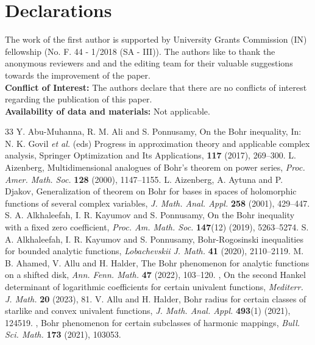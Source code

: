 \documentclass[11pt,reqno]{amsart}
\newtheorem{open problem}{Open problem}[section]
\numberwithin{equation}{section}
\begin{document}
\section{Declarations}
 The work of the first author is supported by University Grants Commission (IN) fellowship (No. F. 44 - 1/2018 (SA - III)). The authors like to
thank the anonymous reviewers and and the editing team for their valuable suggestions towards the improvement of the paper.\\[2mm]
{\bf Conflict of Interest:} The authors declare that there are no conflicts of interest regarding the publication of this paper.\\[1mm]
{\bf Availability of data and materials:} Not applicable.\\[1mm]
\begin{thebibliography}{33}
 {\sc Y. Abu-Muhanna, R. M. Ali and S. Ponnusamy}, On the Bohr inequality,  In: N. K. Govil {\it et al.} (eds) Progress in approximation theory and applicable complex analysis, Springer Optimization and Its Applications, {\bf117} (2017), 269--300. 
 {\sc L. Aizenberg}, Multidimensional analogues of Bohr's theorem on power series, {\it Proc. Amer. Math. Soc.} {\bf128} (2000), 1147--1155.
 {\sc L. Aizenberg, A. Aytuna and P. Djakov}, Generalization of theorem on Bohr for bases in spaces of holomorphic functions of several complex variables, {\it J. Math. Anal. Appl.} {\bf258} (2001), 429--447.
 {\sc S. A. Alkhaleefah, I. R. Kayumov and S. Ponnusamy}, On the Bohr inequality with a fixed zero coefficient, {\it Proc. Am. Math. Soc.} {\bf147}(12) (2019), 5263--5274.
 {\sc S. A. Alkhaleefah, I. R. Kayumov and S. Ponnusamy}, Bohr-Rogosinski inequalities for bounded analytic functions, {\it Lobachevskii J. Math.} {\bf41} (2020), 2110--2119.
 {\sc M. B. Ahamed, V. Allu and H. Halder}, The Bohr phenomenon for analytic functions on a shifted disk, {\it Ann. Fenn. Math.} {\bf47} (2022), 103--120.
, On the second Hankel determinant of logarithmic coefficients for certain univalent functions, {\it Mediterr. J. Math.} {\bf20} (2023), 81.
 {\sc V. Allu and H. Halder}, Bohr radius for certain classes of starlike and convex univalent functions, {\it J. Math. Anal. Appl.} {\bf493}(1) (2021), 124519.
, Bohr phenomenon for certain subclasses of harmonic mappings, {\it Bull. Sci. Math.} {\bf173} (2021), 103053.

\end{thebibliography}
\end{document}
